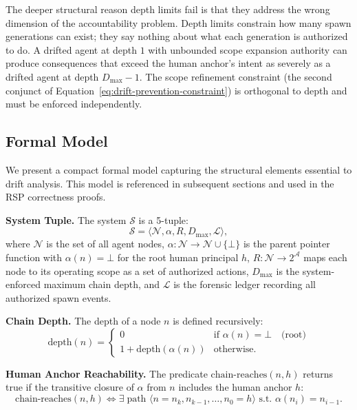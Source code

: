 \documentclass[12pt]{article}
\begin{document}
The deeper structural reason depth limits fail is that they address the wrong dimension of the accountability problem. Depth limits constrain how many spawn generations can exist; they say nothing about what each generation is authorized to do. A drifted agent at depth $1$ with unbounded scope expansion authority can produce consequences that exceed the human anchor's intent as severely as a drifted agent at depth $D_{\max} - 1$. The scope refinement constraint (the second conjunct of Equation~\ref{eq:drift-prevention-constraint}) is orthogonal to depth and must be enforced independently.

\subsection{Formal Model}
\label{sec:drift-model}

We present a compact formal model capturing the structural elements essential to drift analysis. This model is referenced in subsequent sections and used in the RSP correctness proofs.

\medskip
\noindent\textbf{System Tuple.}
The system $\mathcal{S}$ is a 5-tuple:
\begin{equation}
\mathcal{S} = \langle \mathcal{N}, \alpha, R, D_{\max}, \mathcal{L} \rangle,
\label{eq:system-model}
\end{equation}
where $\mathcal{N}$ is the set of all agent nodes, $\alpha: \mathcal{N} \rightarrow \mathcal{N} \cup \{\bot\}$ is the parent pointer function with $\alpha(n) = \bot$ for the root human principal $h$, $R: \mathcal{N} \rightarrow 2^{\mathcal{A}}$ maps each node to its operating scope as a set of authorized actions, $D_{\max}$ is the system-enforced maximum chain depth, and $\mathcal{L}$ is the forensic ledger recording all authorized spawn events.

\medskip
\noindent\textbf{Chain Depth.}
The depth of a node $n$ is defined recursively:
\begin{equation}
\text{depth}(n) = 
\begin{cases}
0 & \text{if } \alpha(n) = \bot \quad \text{(root)} \\[4pt]
1 + \text{depth}(\alpha(n)) & \text{otherwise}.
\end{cases}
\label{eq:depth}
\end{equation}

\medskip
\noindent\textbf{Human Anchor Reachability.}
The predicate $\text{chain-reaches}(n, h)$ returns true if the transitive closure of $\alpha$ from $n$ includes the human anchor $h$:
\begin{equation}
\text{chain-reaches}(n, h) \iff \exists\; \text{path } \langle n = n_k, n_{k-1}, \ldots, n_0 = h \rangle \text{ s.t. } \alpha(n_i) = n_{i-1}.
\label{eq:chain-reaches}
\end{equation}
\end{document}
